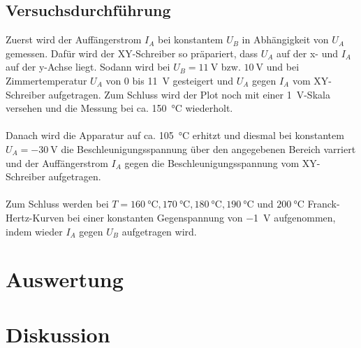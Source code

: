 \subsection{Versuchsdurchführung}
Zuerst wird der Auffängerstrom $I_A$ bei konstantem $U_B$ in Abhängigkeit von $U_A$
gemessen. Dafür wird der XY-Schreiber so präpariert, dass $U_A$ auf der x- und $I_A$
auf der y-Achse liegt. Sodann wird bei $U_B = \SI{11}{\volt}$ bzw. $\SI{10}{\volt}$
und bei Zimmertemperatur $U_A$ von 0 bis \SI{11}{\volt} gesteigert und $U_A$ gegen
$I_A$ vom XY-Schreiber aufgetragen. Zum Schluss wird der Plot noch mit einer \SI{1}{\volt}-Skala
versehen und die Messung bei ca. \SI{150}{\celsius} wiederholt. \\
\\
Danach wird die Apparatur auf ca. \SI{105}{\celsius} erhitzt und diesmal bei konstantem
$U_A = \SI{-30}{\volt}$ die Beschleunigungsspannung über den angegebenen Bereich varriert
und der Auffängerstrom $I_A$ gegen die Beschleunigungsspannung vom XY-Schreiber aufgetragen. \\
\\
Zum Schluss werden bei $T = \SI{160}{\celsius}, \SI{170}{\celsius}, \SI{180}{\celsius}, \SI{190}{\celsius}$ und $\SI{200}{\celsius}$ Franck-Hertz-Kurven
bei einer konstanten Gegenspannung von \SI{-1}{\volt} aufgenommen, indem wieder $I_A$ gegen
$U_B$ aufgetragen wird.

\section{Auswertung}

\section{Diskussion}

\newpage
\nocite{*}
\printbibliography
